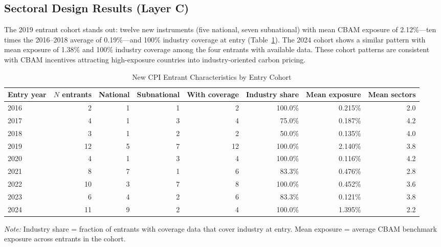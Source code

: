 \documentclass[12pt,a4paper]{article}
\begin{document}
\subsection{Sectoral Design Results (Layer C)}\label{sec:sectoral_results}

The 2019 entrant cohort stands out: twelve new instruments (five national, seven subnational) with mean CBAM exposure of 2.12\%---ten times the 2016--2018 average of 0.19\%---and 100\% industry coverage at entry (Table~\ref{tab:entrant_desc}). The 2024 cohort shows a similar pattern with mean exposure of 1.38\% and 100\% industry coverage among the four entrants with available data. These cohort patterns are consistent with CBAM incentives attracting high-exposure countries into industry-oriented carbon pricing.

\begin{table}[htbp]
\centering
\begin{threeparttable}
\caption{New CPI Entrant Characteristics by Entry Cohort}\label{tab:entrant_desc}
\small
\begin{tabular}{lrrrrrrr}
\toprule
Entry year & $N$ entrants & National & Subnational & With coverage & Industry share & Mean exposure & Mean sectors \\
\midrule
2016 & 2 & 1 & 1 & 2 & 100.0\% & 0.215\% & 2.0 \\
2017 & 4 & 1 & 3 & 4 & 75.0\% & 0.187\% & 4.2 \\
2018 & 3 & 1 & 2 & 2 & 50.0\% & 0.135\% & 4.0 \\
2019 & 12 & 5 & 7 & 12 & 100.0\% & 2.140\% & 3.8 \\
2020 & 4 & 1 & 3 & 4 & 100.0\% & 0.116\% & 4.2 \\
2021 & 8 & 7 & 1 & 6 & 83.3\% & 0.476\% & 2.8 \\
2022 & 10 & 3 & 7 & 8 & 100.0\% & 0.452\% & 3.6 \\
2023 & 6 & 4 & 2 & 6 & 83.3\% & 0.121\% & 3.8 \\
2024 & 11 & 9 & 2 & 4 & 100.0\% & 1.395\% & 2.2 \\
\bottomrule
\end{tabular}
\begin{tablenotes}\small
\item \textit{Note:} Industry share = fraction of entrants with coverage data that cover industry at entry. Mean exposure = average CBAM benchmark exposure across entrants in the cohort.
\end{tablenotes}
\end{threeparttable}
\end{table}
\end{document}
